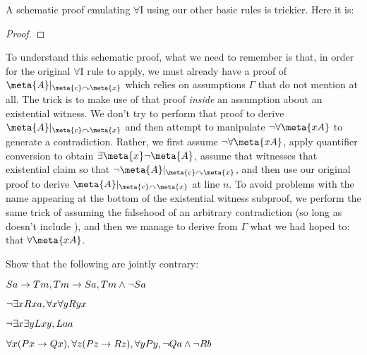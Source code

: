 A schematic proof emulating $\forall$I using our other basic rules is trickier. Here it is: 
\begin{proof}
	\have[\ ]{}{\vdots}
	\open
	\open
	\open
	\have[\ ]{}{\vdots}
	\close
	\close
	\close
\end{proof}
To understand this schematic proof, what we need to remember is that, in order for the original $\forall$I rule to apply, we must already have a proof of $\meta{A}\subs{\meta{c}}{\meta{x}}$ which relies on assumptions $\Gamma$ that do not mention  at all. The trick is to make use of that proof \emph{inside} an assumption about an existential witness. We don't try to perform that proof to derive $\meta{A}\subs{\meta{c}}{\meta{x}}$ and then attempt to manipulate $\enot\forall \meta{xA}$ to generate a contradiction. Rather, we first assume $\enot\forall \meta{xA}$, apply quantifier conversion to obtain $\exists \meta{x}\enot\meta{A}$, assume that  witnesses that existential claim so that $\enot\meta{A}\subs{\meta{c}}{\meta{x}}$, and then use our original proof to derive $\meta{A}\subs{\meta{c}}{\meta{x}}$ at line $n$. To avoid problems with the name appearing at the bottom of the existential witness subproof, we perform the same trick of assuming the falsehood of an arbitrary contradiction (so long as  doesn't include ), and then we manage to derive from $\Gamma$ what we had hoped to: that $\forall \meta{xA}$.


\practiceproblems

\problempart
Show that the following are jointly contrary:
\begin{earg}
\item $Sa\rightarrow Tm, Tm \rightarrow Sa, Tm \wedge \neg Sa$
\item $\neg\exists x Rxa, \forall x \forall y Ryx$
\item $\neg\exists x \exists y Lxy, Laa$
\item $\forall x(Px \rightarrow Qx), \forall z(Pz \rightarrow Rz), \forall y Py, \neg Qa \wedge \neg Rb$
\end{earg}

